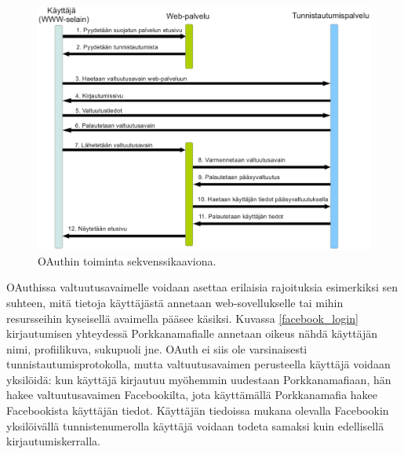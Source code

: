 \begin{figure}[!b]
\centering
\includegraphics[width=\textwidth]{teknologiat/protokollat/oauth.eps}
\caption{OAuthin toiminta sekvenssikaaviona.}%
\label{oauth}
\end{figure}

OAuthissa valtuutusavaimelle voidaan asettaa erilaisia rajoituksia esimerkiksi sen suhteen, mitä tietoja käyttäjästä annetaan web-sovellukselle tai mihin resursseihin kyseisellä avaimella pääsee käsiksi. Kuvassa \ref{facebook_login} kirjautumisen yhteydessä Porkkanamafialle annetaan oikeus nähdä käyttäjän nimi, profiilikuva, sukupuoli jne. OAuth ei siis ole varsinaisesti tunnistautumisprotokolla, mutta valtuutusavaimen perusteella käyttäjä voidaan yksilöidä: kun käyttäjä kirjautuu myöhemmin uudestaan Porkkanamafiaan, hän hakee valtuutusavaimen Facebookilta, jota käyttämällä Porkkanamafia hakee Facebookista käyttäjän tiedot. Käyttäjän tiedoissa mukana olevalla Facebookin yksilöivällä tunnistenumerolla käyttäjä voidaan todeta samaksi kuin edellisellä kirjautumiskerralla.